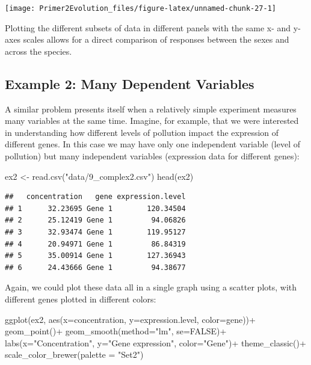 \documentclass[
]{book}
\newenvironment{Shaded}{\begin{snugshade}}{\end{snugshade}}
\newcommand{\AttributeTok}[1]{\textcolor[rgb]{0.77,0.63,0.00}{#1}}
\newcommand{\ConstantTok}[1]{\textcolor[rgb]{0.00,0.00,0.00}{#1}}
\newcommand{\FunctionTok}[1]{\textcolor[rgb]{0.00,0.00,0.00}{#1}}
\newcommand{\NormalTok}[1]{#1}
\newcommand{\OtherTok}[1]{\textcolor[rgb]{0.56,0.35,0.01}{#1}}
\newcommand{\SpecialCharTok}[1]{\textcolor[rgb]{0.00,0.00,0.00}{#1}}
\newcommand{\StringTok}[1]{\textcolor[rgb]{0.31,0.60,0.02}{#1}}
\begin{document}
\texttt{[image: Primer2Evolution\_files/figure-latex/unnamed-chunk-27-1]}

Plotting the different subsets of data in different panels with the same x- and y-axes scales allows for a direct comparison of responses between the sexes and across the species.

\hypertarget{example-2-many-dependent-variables}{%
\subsection{Example 2: Many Dependent Variables}\label{example-2-many-dependent-variables}}

A similar problem presents itself when a relatively simple experiment measures many variables at the same time. Imagine, for example, that we were interested in understanding how different levels of pollution impact the expression of different genes. In this case we may have only one independent variable (level of pollution) but many independent variables (expression data for different genes):

\begin{Shaded}
\begin{Highlighting}[]
\NormalTok{ex2 }\OtherTok{\textless{}{-}} \FunctionTok{read.csv}\NormalTok{(}\StringTok{"data/9\_complex2.csv"}\NormalTok{)}
\FunctionTok{head}\NormalTok{(ex2)}
\end{Highlighting}
\end{Shaded}

\begin{verbatim}
##   concentration   gene expression.level
## 1      32.23695 Gene 1        120.34504
## 2      25.12419 Gene 1         94.06826
## 3      32.93474 Gene 1        119.95127
## 4      20.94971 Gene 1         86.84319
## 5      35.00914 Gene 1        127.36943
## 6      24.43666 Gene 1         94.38677
\end{verbatim}

Again, we could plot these data all in a single graph using a scatter plots, with different genes plotted in different colors:

\begin{Shaded}
\begin{Highlighting}[]
\FunctionTok{ggplot}\NormalTok{(ex2, }\FunctionTok{aes}\NormalTok{(}\AttributeTok{x=}\NormalTok{concentration, }\AttributeTok{y=}\NormalTok{expression.level, }\AttributeTok{color=}\NormalTok{gene))}\SpecialCharTok{+}
    \FunctionTok{geom\_point}\NormalTok{()}\SpecialCharTok{+}
    \FunctionTok{geom\_smooth}\NormalTok{(}\AttributeTok{method=}\StringTok{"lm"}\NormalTok{, }\AttributeTok{se=}\ConstantTok{FALSE}\NormalTok{)}\SpecialCharTok{+}
    \FunctionTok{labs}\NormalTok{(}\AttributeTok{x=}\StringTok{"Concentration"}\NormalTok{, }\AttributeTok{y=}\StringTok{"Gene expression"}\NormalTok{, }\AttributeTok{color=}\StringTok{"Gene"}\NormalTok{)}\SpecialCharTok{+}
    \FunctionTok{theme\_classic}\NormalTok{()}\SpecialCharTok{+}
    \FunctionTok{scale\_color\_brewer}\NormalTok{(}\AttributeTok{palette =} \StringTok{"Set2"}\NormalTok{)}
\end{Highlighting}
\end{Shaded}
\end{document}
